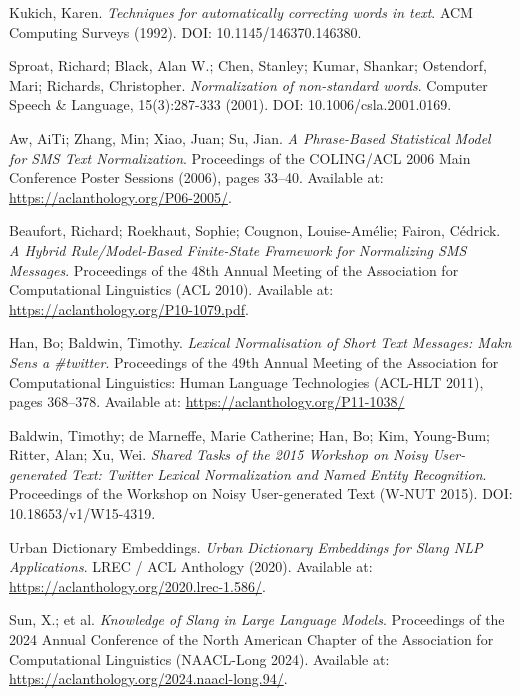 \documentclass[12pt]{article}
\begin{document}
\begin{thebibliography}{9}
Kukich, Karen.
\textit{Techniques for automatically correcting words in text}.
ACM Computing Surveys (1992).
DOI: 10.1145/146370.146380.

Sproat, Richard; Black, Alan W.; Chen, Stanley; Kumar, Shankar; Ostendorf, Mari; Richards, Christopher.
\textit{Normalization of non-standard words}.
Computer Speech \& Language, 15(3):287-333 (2001).
DOI: 10.1006/csla.2001.0169.

Aw, AiTi; Zhang, Min; Xiao, Juan; Su, Jian.
\textit{A Phrase-Based Statistical Model for SMS Text Normalization}.
Proceedings of the COLING/ACL 2006 Main Conference Poster Sessions (2006), pages 33–40.
Available at: \url{https://aclanthology.org/P06-2005/}.

Beaufort, Richard; Roekhaut, Sophie; Cougnon, Louise-Amélie; Fairon, Cédrick.
\textit{A Hybrid Rule/Model-Based Finite-State Framework for Normalizing SMS Messages}.
Proceedings of the 48th Annual Meeting of the Association for Computational Linguistics (ACL 2010).
Available at: \url{https://aclanthology.org/P10-1079.pdf}.

Han, Bo; Baldwin, Timothy.
\textit{Lexical Normalisation of Short Text Messages: Makn Sens a \#twitter}.
Proceedings of the 49th Annual Meeting of the Association for Computational Linguistics: Human Language Technologies (ACL-HLT 2011), pages 368–378.
Available at: \url{https://aclanthology.org/P11-1038/}

Baldwin, Timothy; de Marneffe, Marie Catherine; Han, Bo; Kim, Young-Bum; Ritter, Alan; Xu, Wei.
\textit{Shared Tasks of the 2015 Workshop on Noisy User-generated Text: Twitter Lexical Normalization and Named Entity Recognition}.
Proceedings of the Workshop on Noisy User-generated Text (W-NUT 2015).
DOI: 10.18653/v1/W15-4319.

Urban Dictionary Embeddings.
\textit{Urban Dictionary Embeddings for Slang NLP Applications}.
LREC / ACL Anthology (2020).
Available at: \url{https://aclanthology.org/2020.lrec-1.586/}.

Sun, X.; et al.
\textit{Knowledge of Slang in Large Language Models}.
Proceedings of the 2024 Annual Conference of the North American Chapter of the Association for Computational Linguistics (NAACL-Long 2024).
Available at: \url{https://aclanthology.org/2024.naacl-long.94/}.


\end{thebibliography}
\end{document}
